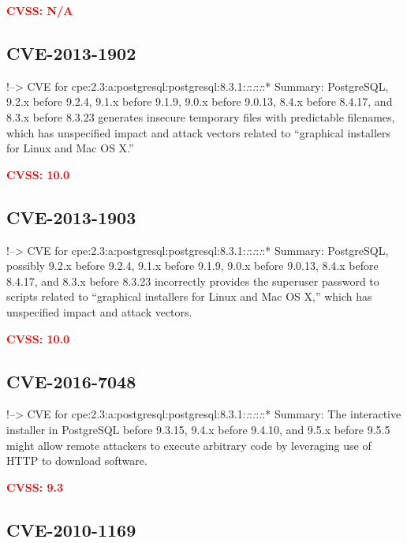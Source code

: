 \documentclass[a4paper, 12pt]{article}
\begin{document}
\textbf{\textcolor{red}{CVSS: N/A}}

\hypertarget{cve-2013-1902}{%
\subsection{CVE-2013-1902}\label{cve-2013-1902}}

!--\textgreater{} CVE for
cpe:2.3:a:postgresql:postgresql:8.3.1:\emph{:}:\emph{:}:\emph{:}:*
Summary: PostgreSQL, 9.2.x before 9.2.4, 9.1.x before 9.1.9, 9.0.x
before 9.0.13, 8.4.x before 8.4.17, and 8.3.x before 8.3.23 generates
insecure temporary files with predictable filenames, which has
unspecified impact and attack vectors related to ``graphical installers
for Linux and Mac OS X.''

\textbf{\textcolor{red}{CVSS: 10.0}}

\hypertarget{cve-2013-1903}{%
\subsection{CVE-2013-1903}\label{cve-2013-1903}}

!--\textgreater{} CVE for
cpe:2.3:a:postgresql:postgresql:8.3.1:\emph{:}:\emph{:}:\emph{:}:*
Summary: PostgreSQL, possibly 9.2.x before 9.2.4, 9.1.x before 9.1.9,
9.0.x before 9.0.13, 8.4.x before 8.4.17, and 8.3.x before 8.3.23
incorrectly provides the superuser password to scripts related to
``graphical installers for Linux and Mac OS X,'' which has unspecified
impact and attack vectors.

\textbf{\textcolor{red}{CVSS: 10.0}}

\hypertarget{cve-2016-7048}{%
\subsection{CVE-2016-7048}\label{cve-2016-7048}}

!--\textgreater{} CVE for
cpe:2.3:a:postgresql:postgresql:8.3.1:\emph{:}:\emph{:}:\emph{:}:*
Summary: The interactive installer in PostgreSQL before 9.3.15, 9.4.x
before 9.4.10, and 9.5.x before 9.5.5 might allow remote attackers to
execute arbitrary code by leveraging use of HTTP to download software.

\textbf{\textcolor{red}{CVSS: 9.3}}

\hypertarget{cve-2010-1169}{%
\subsection{CVE-2010-1169}\label{cve-2010-1169}}
\end{document}
